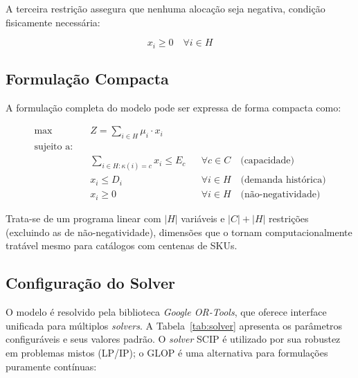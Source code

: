 \documentclass[11pt,a4paper]{article}
\begin{document}
A terceira restrição assegura que nenhuma alocação seja negativa, condição
fisicamente necessária:

\begin{equation}\label{eq:auto:026}
x_i \geq 0 \quad \forall i \in H
\end{equation}

\subsection{Formulação Compacta}

A formulação completa do modelo pode ser expressa de forma compacta como:

\begin{equation}\label{eq:auto:027}
\boxed{
\begin{aligned}
\max \quad & Z = \sum_{i \in H} \mu_i \cdot x_i \\[10pt]
\text{sujeito a:} \quad & \\[4pt]
& \sum_{i \in H : \kappa(i) = c} x_i \leq E_c && \forall c \in C \quad \text{(capacidade)} \\[6pt]
& x_i \leq D_i && \forall i \in H \quad \text{(demanda histórica)} \\[6pt]
& x_i \geq 0 && \forall i \in H \quad \text{(não-negatividade)}
\end{aligned}
}
\end{equation}

Trata-se de um programa linear com $|H|$ variáveis e $|C| + |H|$ restrições
(excluindo as de não-negatividade), dimensões que o tornam computacionalmente
tratável mesmo para catálogos com centenas de SKUs.

\subsection{Configuração do Solver}

O modelo é resolvido pela biblioteca \textit{Google OR-Tools}, que oferece
interface unificada para múltiplos \textit{solvers}. A Tabela~\ref{tab:solver}
apresenta os parâmetros configuráveis e seus valores padrão. O \textit{solver}
SCIP é utilizado por sua robustez em problemas mistos (LP/IP); o GLOP é uma
alternativa para formulações puramente contínuas:
\end{document}
